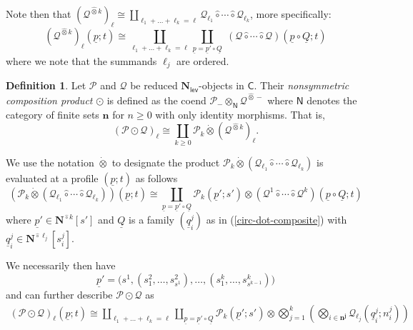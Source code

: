 \documentclass[11pt]{amsart}
\theoremstyle{definition}
\newtheorem{definition}[subsection]{Definition}
\theoremstyle{remark}
\newcommand{\Cal}[1]{\mathcal{#1}}
\newcommand{\Ncirc}[1]{\mathbf{N}^{\hat{\circ}#1}}
\newcommand{\circhat}{\hat{\circ}}
\newcommand{\circdot}{{\odot}}
\newcommand{\tensorhat}{\hat{\otimes}}
\newcommand{\tensordot}{\dot{\otimes}}
\newcommand{\Nl}{\mathbf{N}_{\mathsf{lev}}}
\begin{document}
Note then that $(\Cal{Q}^{\tensorhat k})_{\ell} \cong \coprod_{\ell_1+\dots+\ell_k=\ell} \Cal{Q}_{\ell_1} \hat{\circ} \cdots \hat{\circ} \Cal{Q}_{\ell_k}$, more specifically: \begin{equation}
   (\Cal{Q}^{\tensorhat k})_{\ell}(\underline{p};t) \cong \coprod_{\ell_1+\dots+\ell_k=\ell} \coprod_{\underline{p}=\underline{p}' \circ \underline{Q}} \; (\Cal{Q} \circhat \cdots \circhat \Cal{Q})(\underline{p}\circ \underline{Q}; t)
    \end{equation}
where we note that the summands $\ell_j$ are ordered.

\begin{definition} \label{ccp} 
Let $\Cal{P}$ and $\Cal{Q}$ be reduced $\Nl$-objects in $\mathsf{C}$. Their \textit{nonsymmetric composition product} $\circdot$ is defined as the coend $\Cal{P}_{-} \otimes_{\mathsf{N}} \Cal{Q}^{\tensorhat -}$ where $\mathsf{N}$ denotes the category of finite sets $\mathbf{n}$ for $n\geq 0$ with only identity morphisms. That is, \[(\Cal{P}{\odot} \Cal{Q})_{\ell}\cong \coprod_{k\geq 0} \Cal{P}_k \tensordot (\Cal{Q}^{\hat{\otimes} k})_{\ell}.
\]
\end{definition}

We use the notation $\tensordot$ to designate the product $\Cal{P}_k \tensordot (\Cal{Q}_{\ell_1} \circhat \cdots \circhat \Cal{Q}_{\ell_k})$ is evaluated at a profile $(\underline{p};t)$ as follows \[(\Cal{P}_k \tensordot (\Cal{Q}_{\ell_1}\circhat \cdots \circhat \Cal{Q}_{\ell_k})) (\underline{p};t) \cong \coprod_{\underline{p}=\underline{p}' \circ \underline{Q}} \Cal{P}_k(\underline{p}';s') \otimes (\Cal{Q}^1 \circhat \cdots \circhat \Cal{Q}^k)(\underline{p}\circ \underline{Q}; t) %
\] 
where $\underline{p}'\in\Ncirc{k}[s']$ and $\underline{Q}$ is a family $(\underline{q}_i^j)$ as in (\ref{circ-dot-composite}) with $\underline{q}_i^j\in\Ncirc{\ell_{j}}[s_i^j]$.

We necessarily then have \[\label{s-def}
\underline{p}'=\big(s^1, (s^2_1,\dots,s^2_{s^1}), \dots , (s^k_1,\dots, s^k_{s^{k-1}})\big)\] and can further describe $\Cal{P} \circdot \Cal{Q}$ as \begin{align}\label{p=p'Q} 
    (\Cal{P} \circdot \Cal{Q})_{\ell}(\underline{p};t) \cong \coprod_{\ell_1+\dots+\ell_k=\ell} \coprod_{\underline{p}=\underline{p}' \circ \underline{Q}} \Cal{P}_k(\underline{p}';s') \otimes \bigotimes_{j=1}^{k} \left( \bigotimes_{i\in\mathbf{n^j}} \Cal{Q}_{\ell_j}(\underline{q}^j_i;n^j_i) \right)
    \end{align}
\end{document}
